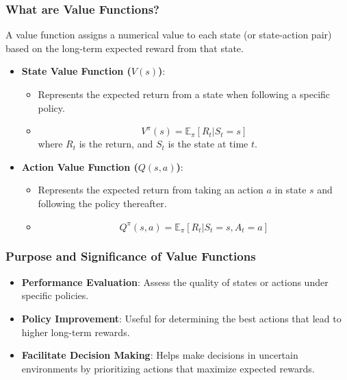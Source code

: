 \documentclass[aspectratio=169]{beamer}
\begin{document}
\begin{frame}[fragile]
    \frametitle{What are Value Functions?}
    A value function assigns a numerical value to each state (or state-action pair) based on the long-term expected reward from that state.

    \begin{itemize}
        \item \textbf{State Value Function ($V(s)$)}:
        \begin{itemize}
            \item Represents the expected return from a state when following a specific policy.
            \item \begin{equation} 
                V^\pi(s) = \mathbb{E}_\pi \left[ R_t | S_t = s \right] 
               \end{equation}
               where \(R_t\) is the return, and \(S_t\) is the state at time \(t\).
        \end{itemize}
        
        \item \textbf{Action Value Function ($Q(s, a)$)}:
        \begin{itemize}
            \item Represents the expected return from taking an action \(a\) in state \(s\) and following the policy thereafter.
            \item \begin{equation} 
                Q^\pi(s, a) = \mathbb{E}_\pi \left[ R_t | S_t = s, A_t = a \right] 
               \end{equation}
        \end{itemize}
    \end{itemize}
\end{frame}

\begin{frame}[fragile]
    \frametitle{Purpose and Significance of Value Functions}
    \begin{itemize}
        \item \textbf{Performance Evaluation}: Assess the quality of states or actions under specific policies.
        
        \item \textbf{Policy Improvement}: Useful for determining the best actions that lead to higher long-term rewards.
        
        \item \textbf{Facilitate Decision Making}: Helps make decisions in uncertain environments by prioritizing actions that maximize expected rewards.
    \end{itemize}
\end{frame}
\end{document}
